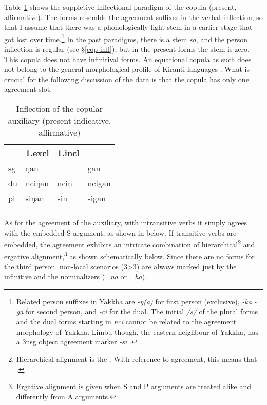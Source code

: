 Table \ref{copula} shows the suppletive inflectional paradigm of the copula (present, affirmative). The forms resemble the agreement suffixes in the verbal inflection, so that I assume that there was a phonologically light stem in a earlier stage that got lost over time.\footnote{Related person suffixes in Yakkha are \emph{-ŋ(a)} for first person (exclusive), \emph{-ka \ti -ga} for second person, and \emph{-ci} for the dual. The initial  \emph{/s/} of the plural  forms and the dual forms starting in \emph{nci} cannot be related to the agreement morphology of Yakkha. Limbu though, the eastern neighbour of Yakkha, has a 3nsg object agreement marker \emph{-si} \citep[76]{Driem1987A-grammar}.}  In the past paradigms, there is a stem \emph{sa}, and the person inflection is regular (see §\ref{cop-infl}), but in the present forms the stem is zero. This copula does not have infinitival forms. An equational copula as such does not belong to the general morphological profile of Kiranti languages \citep[276]{Bickel1999Nominalization}. What is crucial for the following discussion of the data is that the copula has only one agreement slot.

\begin{table}[htp]
\begin{center}
\begin{tabular}{llll}
\lsptoprule
&{\sc 1.excl}&{\sc 1.incl}&{\sc 2}\\
\midrule
{\sc sg}&  ŋan& &gan\\
{\sc du} & nciŋan&ncin& ncigan \\
{\sc pl}  & siŋan& sin&sigan\\
\lspbottomrule
\end{tabular}
\caption{Inflection of the copular auxiliary (present indicative, affirmative)}\label{copula}
\end{center}
\end{table}


As for the agreement of the auxiliary, with intransitive verbs it simply agrees with the embedded S argument, as shown in \Next[a] below. If transitive verbs are embedded, the agreement exhibits an intricate combination of hierarchical\footnote{Hierarchical alignment is the  \citep[10]{Siewierska1998On-nominal}. With reference to agreement, this means that   \citep[66]{Nichols1992Language}.} and ergative alignment,\footnote{Ergative alignment is given when S and P arguments are treated alike and differently from A arguments. 
} as shown schematically below.  Since there are no forms for the third person, non-local scenarios (3>3) are always marked just by the infinitive and the nominalizers (\emph{=na} or \emph{=ha}). 

